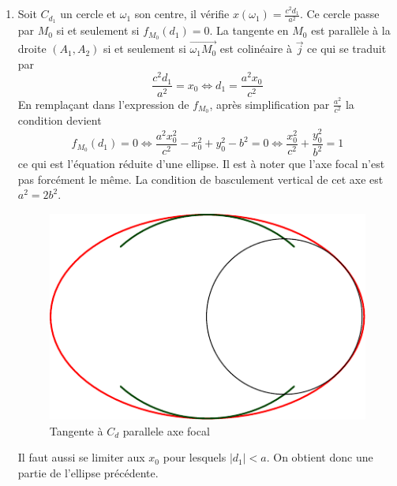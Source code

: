 \begin{enumerate}
\item Soit $C_{d_1}$ un cercle et $\omega_1$ son centre, il vérifie $x(\omega_1)=\frac{c^2d_1}{a^2}$. Ce cercle passe par $M_0$ si et seulement si $f_{M_0}(d_1)=0$. La tangente en $M_0$ est parallèle à la droite $(A_1,A_2)$ si et seulement si $\overrightarrow{\omega_1 M_0}$ est colinéaire à $\overrightarrow j$ ce qui se traduit par 
\begin{displaymath}
 \frac{c^2d_1}{a^2} = x_0 \Leftrightarrow d_1 = \frac{a^2 x_0 }{c^2}
\end{displaymath}
 En remplaçant dans l'expression de $f_{M_0}$, après simplification par $\frac{a^2}{c^2}$ la condition devient
\begin{displaymath}
 f_{M_0}(d_1)=0 \Leftrightarrow \frac{a^2x_0^2}{c^2 }-x_0^2 +y_0^2-b^2=0
\Leftrightarrow \frac{x_0^2}{c^2} + \frac{y_0^2}{b^2} = 1
\end{displaymath}
ce qui est l'équation réduite d'une ellipse. Il est à noter que l'axe focal n'est pas forcément le même. La condition de basculement vertical de cet axe est $a^2 = 2b^2$.
\begin{figure}[h!t]
 \centering
 \includegraphics{./Cellipse1_2.pdf}
 \caption{Tangente à $C_d$ parallele axe focal}
 \label{fig:Cellipse_1_2}
\end{figure}
Il faut aussi se limiter aux $x_0$ pour lesquels $|d_1|<a$. On obtient donc une partie de l'ellipse précédente.
\end{enumerate}

